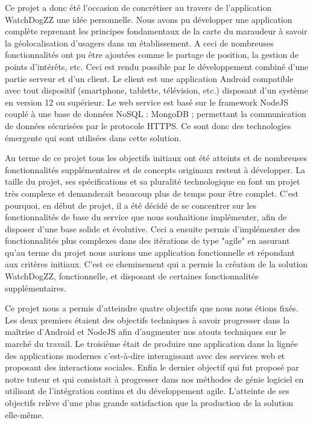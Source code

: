 
Ce projet a donc été l’occasion de concrétiser au travers de l’application WatchDogZZ une idée personnelle. Nous avons pu développer une application complète reprenant les principes fondamentaux de la carte du maraudeur à savoir la géolocalisation d’usagers dans un établissement. A ceci de nombreuses fonctionnalités ont pu être ajoutées comme le partage de position, la gestion de points d’intérêts, etc.
Ceci est rendu possible par le développement combiné d'une partie serveur et d'un client. Le client est une application Android compatible avec tout dispositif (smartphone, tablette, télévision, etc.) disposant d’un système en version 12 ou supérieur. Le web service est basé sur le framework NodeJS couplé à une base de données NoSQL : MongoDB ; permettant la communication de données sécurisées par le protocole HTTPS. Ce sont donc des technologies émergente qui sont utilisées dans cette solution.

Au terme de ce projet tous les objectifs initiaux ont été atteints et de nombreuses fonctionnalités supplémentaires et de concepts originaux restent à développer. La taille du projet, ses spécifications et sa pluralité technologique en font un projet très complexe et demanderait beaucoup plus de temps pour être complet.
C'est pourquoi, en début de projet, il a été décidé de se concentrer sur les fonctionnalités de base du service que nous souhaitions implémenter, afin de disposer d'une base solide et évolutive.
Ceci a ensuite permis d’implémenter des fonctionnalités plus complexes dans des itérations de type "agile" en assurant qu’au terme du projet nous aurions une application fonctionnelle et répondant aux critères initiaux.
C'est ce cheminement qui a permis la création de la solution WatchDogZZ, fonctionnelle, et disposant de certaines fonctionnalités supplémentaires.

Ce projet nous a permis d’atteindre quatre objectifs que nous nous étions fixés. Les deux premiers étaient des objectifs techniques à savoir progresser dans la maîtrise d’Android et NodeJS afin d’augmenter nos atouts techniques sur le marché du travail. Le troisième était de produire une application dans la lignée des applications modernes c’est-à-dire interagissant avec des services web et proposant des interactions sociales. Enfin le dernier objectif qui fut proposé par notre tuteur et qui consistait à progresser dans nos méthodes de génie logiciel en utilisant de l’intégration continu et du développement agile. L’atteinte de ses objectifs relève d’une plus grande satisfaction que la production de la solution elle-même.

